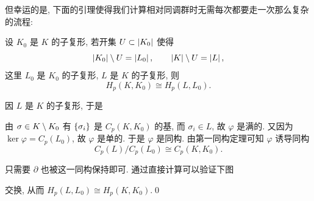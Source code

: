 但幸运的是, 下面的引理使得我们计算相对同调群时无需每次都要走一次那么复杂的流程:

\begin{Theorem}[切除定理]
	设 $ K_0 $ 是 $ K $ 的子复形, 若开集 $ U\subset\left| K_0 \right|  $ 使得
	\[
		\left| K_0 \right| \setminus U=\left| L_0 \right| ,\qquad\left| K \right| \setminus U=\left| L \right| ,
	\]
	这里 $ L_0 $ 是 $ K_0 $ 的子复形, $ L $ 是 $ K $ 的子复形, 则
	\[
		H_p(K,K_0)\cong H_p(L,L_0).
	\]
\end{Theorem}
\begin{Proof}
	因 $ L $ 是 $ K $ 的子复形, 于是
	\begin{center}
	\end{center}
	由 $ \sigma\in K\setminus K_0 $ 有 $ \left\{ \sigma_i \right\} $ 是 $ C_p(K,K_0) $ 的基, 而 $ \sigma_i\in L $, 故 $ \varphi $ 是满的. 又因为 $ \ker\varphi=C_p(L_0) $, 故 $ \varphi $ 是单的. 于是 $ \varphi $ 是同构. 由第一同构定理可知 $ \varphi $ 诱导同构
	\[
		C_p(L)/C_p(L_0)\cong C_p(K,K_0).
	\]
	
	只需要 $ \partial $ 也被这一同构保持即可. 通过直接计算可以验证下图
	\begin{center}
	\end{center}
	交换, 从而 $ H_p(L,L_0)\cong H_p(K,K_0) $.\qed
\end{Proof}

